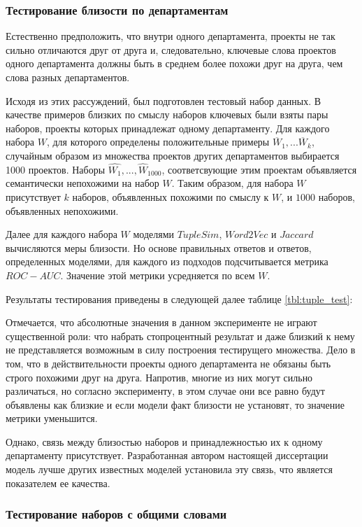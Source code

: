 \subsubsection{Тестирование близости по департаментам}
Естественно предположить, что  внутри одного департамента, проекты не так сильно отличаются друг от друга и, следовательно, ключевые слова проектов одного департамента должны быть в среднем более похожи друг на друга, чем слова разных департаментов.

Исходя из этих рассуждений, был подготовлен тестовый набор данных. В качестве примеров близких по смыслу наборов ключевых были взяты пары наборов, проекты которых принадлежат одному департаменту. Для каждого набора $W$, для которого определены положительные примеры $\overline{W}_{1}, ... \overline{W}_{k}$, случайным образом из множества проектов других департаментов выбирается 1000 проектов. Наборы $\hat{W_1}, ..., \hat{W}_{1000}$, соответсвующие этим проектам объявляется семантически непохожими на набор $W$. Таким образом, для набора $W$ присутствует $k$ наборов, объявленных похожими по смыслу к $W$, и $1000$ наборов, объявленных непохожими.

Далее для каждого набора $W$ моделями $TupleSim$, $Word2Vec$ и  $Jaccard$ вычисляются меры близости. Но основе правильных ответов и ответов, определенных моделями, для каждого из подходов подсчитывается метрика $ROC-AUC$. Значение этой метрики усредняется по всем $W$.

Результаты тестирования приведены в следующей далее таблице \ref{tbl:tuple_test}:

Отмечается, что абсолютные значения в данном эксперименте не играют существенной роли: что набрать стопроцентный результат и даже близкий к нему не представляется возможным в силу построения тестирущего множества. Дело в том, что в действительности проекты одного департамента не обязаны быть строго похожими друг на друга. Напротив, многие из них могут сильно различаться, но согласно эксперименту, в этом случае они все равно будут объявлены как близкие и если модели факт близости не установят, то значение метрики уменьшится. 

Однако, связь между близостью наборов и принадлежностью их к одному департаменту присутствует. Разработанная автором настоящей диссертации модель лучше других известных моделей установила эту связь, что является показателем ее качества.

\subsubsection{Тестирование наборов с общими словами}


